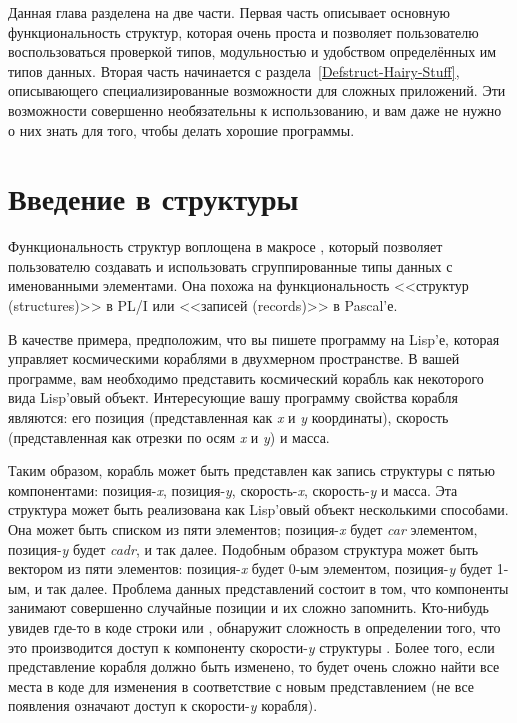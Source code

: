 Данная глава разделена на две части. Первая часть описывает основную
функциональность структур, которая очень проста и позволяет пользователю
воспользоваться проверкой типов, модульностью и удобством определённых им типов
данных. Вторая часть начинается с раздела~\ref{Defstruct-Hairy-Stuff},
описывающего специализированные возможности для сложных приложений. Эти
возможности совершенно необязательны к использованию, и вам даже не нужно о них
знать для того, чтобы делать хорошие программы.

\section{Введение в структуры}
\label{DEFSTRUCT-INTRO-SECTION}

Функциональность структур воплощена в макросе , который позволяет
пользователю создавать и использовать сгруппированные типы данных с именованными
элементами. Она похожа на функциональность <<структур (structures)>> в {PL/I}
или <<записей (records)>> в Pascal'е.

В качестве примера, предположим, что вы пишете программу на Lisp'е, которая
управляет космическими кораблями в двухмерном пространстве.
В вашей программе, вам необходимо представить космический корабль как некоторого
вида Lisp'овый объект. Интересующие вашу программу свойства корабля являются: его
позиция (представленная как \emph{x} и \emph{y} координаты), скорость
(представленная как отрезки по осям \emph{x} и \emph{y}) и масса.

Таким образом, корабль может быть представлен как запись структуры с пятью
компонентами: позиция-\emph{x}, позиция-\emph{y}, скорость-\emph{x},
скорость-\emph{y} и масса.
Эта структура может быть реализована как Lisp'овый объект несколькими способами.
Она может быть списком из пяти элементов; позиция-\emph{x} будет \emph{car}
элементом, позиция-\emph{y} будет \emph{cadr}, и так далее. Подобным образом
структура может быть вектором из пяти элементов: позиция-\emph{x} будет 0-ым
элементом, позиция-\emph{y} будет 1-ым, и так далее. Проблема данных
представлений состоит в том, что компоненты занимают совершенно случайные
позиции и их сложно запомнить. Кто-нибудь увидев где-то в коде
строки  или , обнаружит сложность в
определении того, что это производится доступ к компоненту скорости-\emph{y}
структуры . Более того, если представление корабля должно быть
изменено, то будет очень сложно найти все места в коде для изменения в
соответствие с новым представлением (не все появления  означают
доступ к скорости-\emph{y} корабля). 

